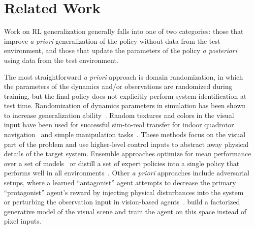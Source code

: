 \documentclass{article}
\begin{document}
\section{Related Work}
Work on RL generalization generally falls into one of two categories: those that improve \emph{a priori} generalization of the policy without data from the test environment,
and those that update the parameters of the policy \emph{a posteriori} using data from the test environment.

The most straightforward \emph{a priori} approach is domain randomization,
in which the parameters of the dynamics and/or observations are randomized during training,
but the final policy does not explicitly perform system identification at test time.
%
Randomization of dynamics parameters in simulation has been shown to increase generalization ability~\citep{antonova-pivoting-corr17, zhu-RL-IL-diverse}.
Random textures and colors in the visual input have been used for successful sim-to-real transfer
for indoor quadrotor navigation~\citep{sadeghi-cad2rl-rss17}
and simple manipulation tasks~\citep{tobin-domainrand-arxiv17,james-domain-xfer}.
These methods focus on the visual part of the problem and use higher-level control inputs
to abstract away physical details of the target system.
Ensemble approaches optimize for mean performance over a set of models~\citep{mordatch-ensemble-icra15}
or distill a set of expert policies into a single policy that performs well in all environments~\citep{actor-mimic,teh-distral}.
%
Other \emph{a priori} approaches include adversarial setups,
where a learned ``antagonist'' agent attempts to decrease the primary ``protagonist'' agent's reward
by injecting physical disturbances into the system~\citep{pinto-robust-adversarial-RL}
or perturbing the observation input in vision-based agents~\citep{huang-adversarial-attacks}.
\citet{higgins-DARLA} build a factorized generative model of the visual scene
and train the agent on this space instead of pixel inputs.
\end{document}
